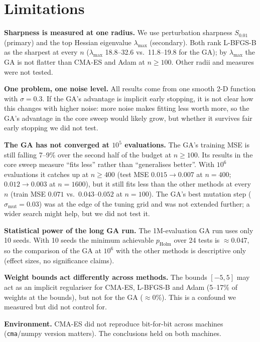 \documentclass[11pt,a4paper]{article}
\newcommand{\cmaes}{CMA-ES}
\newcommand{\lbfgs}{L-BFGS-B}
\begin{document}
\section{Limitations}

\textbf{Sharpness is measured at one radius.} We use perturbation sharpness $S_{0.01}$ (primary) and the top Hessian
eigenvalue $\lambda_{\max}$ (secondary). Both rank \lbfgs{} as the sharpest at every $n$ ($\lambda_{\max}$ 18.8--32.6  vs.\ 11.8--19.8 for the GA); by
$\lambda_{\max}$ the GA is not flatter than \cmaes{} and Adam at $n\ge100$.
Other  radii and measures \citep{keskar2017large,dinh2017sharp} were not tested.

\textbf{One problem, one noise level.} All results come from one smooth 2-D
function with $\sigma=0.3$. If the GA's advantage is implicit early stopping,
it is not clear how this changes with higher noise: more noise makes fitting less worth more, so the GA's advantage
in the core sweep would likely grow, but whether it survives fair early stopping we did not test.

\textbf{The GA has not converged at $10^5$ evaluations.} The GA's training MSE
is still falling 7--9\% over the second half of the budget at $n\ge100$. Its
results in the core sweep measure ``fits less'' rather than ``generalises
better''. With $10^6$ evaluations it catches up at $n\ge400$ (test MSE
$0.015\to0.007$ at $n=400$; $0.012\to0.003$ at $n=1600$), but it still fits
less than the other methods at every $n$ (train MSE $0.071$ vs.\ $0.043$--$0.052$
at $n=100$). The GA's best mutation step ($\sigma_{\mathrm{mut}}=0.03$) was at
the edge of the tuning grid and was not extended further; a wider search might
help, but we did not test it.

\textbf{Statistical power of the long GA run.} The 1M-evaluation GA run uses
only 10 seeds. With 10 seeds the minimum achievable $p_{\mathrm{Holm}}$ over
24 tests is $\approx0.047$, so the comparison of the GA at $10^6$ with the other methods is descriptive only (effect sizes, no significance
claims).

\textbf{Weight bounds act differently across methods.} The bounds $[-5,5]$ may act
as an implicit regulariser for \cmaes, \lbfgs{} and Adam (5--17\% of weights
at the bounds), but not for the GA ($\approx0\%$). This is a confound we
measured but did not control for.

\textbf{Environment.} \cmaes{} did not reproduce bit-for-bit across machines
(\texttt{cma}/numpy version matters). The conclusions held on both machines.
\end{document}
